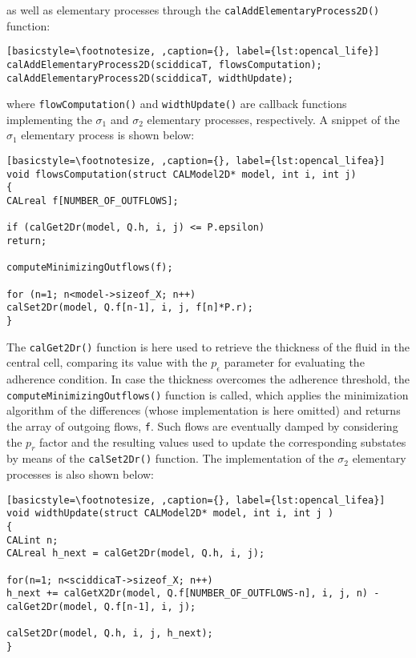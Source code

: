 \noindent as well as elementary processes through the
\verb'calAddElementaryProcess2D()' function:

\begin{lstlisting}[basicstyle=\footnotesize, ,caption={}, label={lst:opencal_life}]
calAddElementaryProcess2D(sciddicaT, flowsComputation);
calAddElementaryProcess2D(sciddicaT, widthUpdate);
\end{lstlisting}

\noindent where \verb'flowComputation()' and \verb'widthUpdate()'
are callback functions implementing the $\sigma_1$ and $\sigma_2$
elementary processes, respectively. A snippet of the $\sigma_1$
elementary process is shown below:

\begin{lstlisting}[basicstyle=\footnotesize, ,caption={}, label={lst:opencal_lifea}]
void flowsComputation(struct CALModel2D* model, int i, int j)
{
CALreal f[NUMBER_OF_OUTFLOWS];

if (calGet2Dr(model, Q.h, i, j) <= P.epsilon)
return;

computeMinimizingOutflows(f);

for (n=1; n<model->sizeof_X; n++)
calSet2Dr(model, Q.f[n-1], i, j, f[n]*P.r);
}
\end{lstlisting}

\noindent The \verb'calGet2Dr()' function is here used to retrieve
the thickness of the fluid in the central cell, comparing its value
with the $p_\epsilon$ parameter for evaluating the adherence
condition. In case the thickness overcomes the adherence threshold,
the \verb'computeMinimizingOutflows()' function is called, which
applies the minimization algorithm of the differences (whose
implementation is here omitted) and returns the array of outgoing
flows, \verb'f'. Such flows are eventually damped by considering the
$p_r$ factor and the resulting values used to update the
corresponding substates by means of the \verb'calSet2Dr()'
function. The implementation of the $\sigma_2$ elementary processes
is also shown below:

\begin{lstlisting}[basicstyle=\footnotesize, ,caption={}, label={lst:opencal_lifea}]
void widthUpdate(struct CALModel2D* model, int i, int j )
{
CALint n;
CALreal h_next = calGet2Dr(model, Q.h, i, j);

for(n=1; n<sciddicaT->sizeof_X; n++)
h_next += calGetX2Dr(model, Q.f[NUMBER_OF_OUTFLOWS-n], i, j, n) - calGet2Dr(model, Q.f[n-1], i, j);

calSet2Dr(model, Q.h, i, j, h_next);
}
\end{lstlisting}

